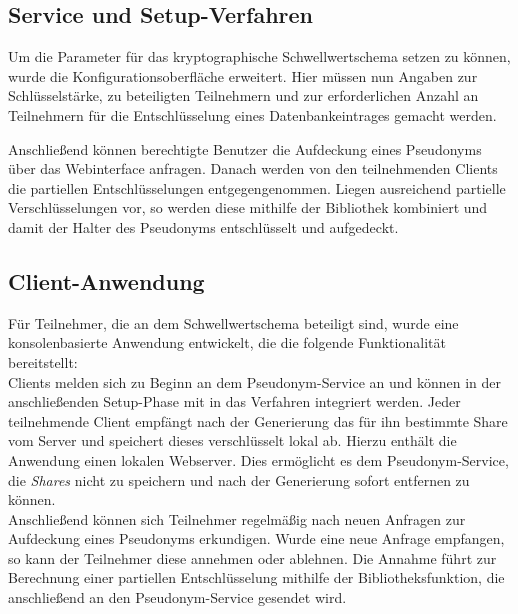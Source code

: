 \subsection{Service und Setup-Verfahren}


Um die Parameter für das kryptographische Schwellwertschema setzen zu können, wurde die Konfigurationsoberfläche erweitert. Hier müssen nun Angaben zur Schlüsselstärke, zu beteiligten Teilnehmern und zur erforderlichen Anzahl an Teilnehmern für die Entschlüsselung eines Datenbankeintrages gemacht werden.

Anschließend können berechtigte Benutzer die Aufdeckung eines Pseudonyms über das Webinterface anfragen. Danach werden von den teilnehmenden Clients die partiellen Entschlüsselungen entgegengenommen. Liegen ausreichend partielle Verschlüsselungen vor, so werden diese mithilfe der Bibliothek kombiniert und damit der Halter des Pseudonyms entschlüsselt und aufgedeckt. 

\subsection{Client-Anwendung}

%

Für Teilnehmer, die an dem Schwellwertschema beteiligt sind, wurde eine konsolenbasierte Anwendung entwickelt, die die folgende Funktionalität bereitstellt:\\
Clients melden sich zu Beginn an dem Pseudonym-Service an und können in der anschließenden Setup-Phase mit in das Verfahren integriert werden. Jeder teilnehmende Client empfängt nach der Generierung das für ihn bestimmte Share vom Server und speichert dieses verschlüsselt lokal ab. Hierzu enthält die Anwendung einen lokalen Webserver. Dies ermöglicht es dem Pseudonym-Service, die \textit{Shares} nicht zu speichern und nach der Generierung sofort entfernen zu können.\\
Anschließend können sich Teilnehmer regelmäßig nach neuen Anfragen zur Aufdeckung eines Pseudonyms erkundigen. Wurde eine neue Anfrage empfangen, so kann der Teilnehmer diese annehmen oder ablehnen. Die Annahme führt zur Berechnung einer partiellen Entschlüsselung mithilfe der Bibliotheksfunktion, die anschließend an den Pseudonym-Service gesendet wird.

